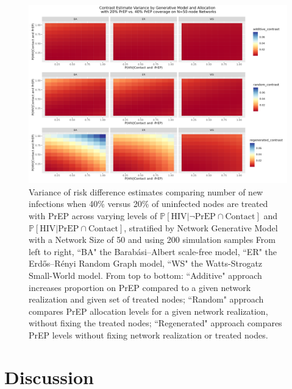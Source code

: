 \documentclass{article}
\theoremstyle{definition}
\begin{document}
\begin{figure}[H]
    \centering
    \includegraphics[width=\linewidth]{Corrected Figures/Generative Model Variance Plot.png}
    \caption{Variance of risk difference estimates comparing number of new infections when 40\% versus 20\% of uninfected nodes are treated with PrEP across varying levels of $\mathbb{P}\left[\text{HIV} \vert \neg \text{PrEP} \cap \text{Contact}\right]$ and $\mathbb{P}\left[\text{HIV} \vert \text{PrEP} \cap \text{Contact}\right]$, stratified by Network Generative Model with a Network Size of 50 and using 200 simulation samples %
    From left to right, ``BA" the Barabási–Albert scale-free model, ``ER" the Erdős–Rényi Random Graph model, ``WS" the Watts-Strogatz Small-World model. From top to bottom: ``Additive" approach increases proportion on PrEP compared to a given network realization and given set of treated nodes; ``Random" approach compares PrEP allocation levels for a given network realization, without fixing the treated nodes; ``Regenerated" approach compares PrEP levels without fixing network realization or treated nodes. 
    }
    \label{fig:Figure 12}
\end{figure}


\section{Discussion}
\end{document}

